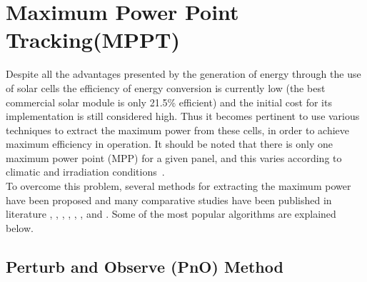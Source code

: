 {%


\section{Maximum Power Point Tracking(MPPT)}


Despite all the advantages presented by the generation of energy through the use of solar cells the efficiency of energy conversion is currently low (the best commercial solar module is only 21.5\% efficient) and the initial cost for its implementation is still considered high. Thus it becomes pertinent to use various techniques to extract the maximum power from these cells, in order to achieve maximum efficiency in operation. It should be noted that there is only one maximum power point (MPP) for a given panel, and this varies according to climatic and irradiation conditions~\cite{eltawil2013mppt}.\\

To overcome this problem, several methods for extracting the maximum power have been proposed and many comparative studies have been published in literature  \cite{chu2009robust}, \cite{clark2006power}, \cite{eltawil2013mppt}, \cite{esram2007comparison}, \cite{faranda2008energy}, \cite{houssamo2013experimental}, \cite{ngan2011study} and \cite{reza2013classification}. Some of the most popular algorithms are explained below.

\subsection{Perturb and Observe (PnO) Method } \label{sec:pno_sec}

}
